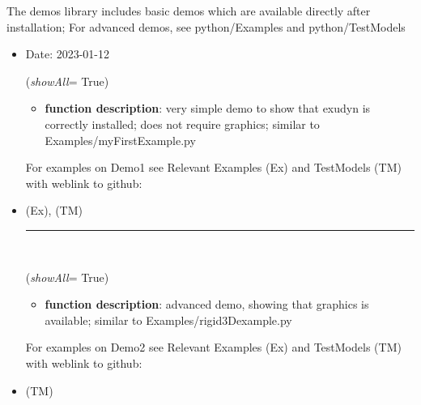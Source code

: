 \begin{itemize}[leftmargin=1.4cm]
\begin{itemize}[leftmargin=1.4cm]
\begin{itemize}[leftmargin=1.4cm]
\begin{itemize}[leftmargin=0.5cm]
\begin{itemize}[leftmargin=1.4cm]
%
\label{sec:module:demos}
  The demos library includes basic demos which are available directly after installation;
           For advanced demos, see python/Examples and python/TestModels
\begin{itemize}[leftmargin=1.4cm]
\setlength{\itemindent}{-1.4cm}
\item[]Date:      2023-01-12
\ei
\begin{flushleft}
\label{sec:demos:Demo1}
({\it showAll}= True)
\end{flushleft}
\setlength{\itemindent}{0.7cm}
\begin{itemize}[leftmargin=0.7cm]
\item[--]
{\bf function description}: very simple demo to show that exudyn is correctly installed; does not require graphics; similar to Examples/myFirstExample.py
\vspace{12pt}\end{itemize}
%
%
\noindent For examples on Demo1 see Relevant Examples (Ex) and TestModels (TM) with weblink to github:
\bi
 \item \footnotesize {} (Ex), 
 (TM)
\ei

%
\noindent\rule{8cm}{0.75pt}\vspace{1pt} \\ 
\begin{flushleft}
\label{sec:demos:Demo2}
({\it showAll}= True)
\end{flushleft}
\setlength{\itemindent}{0.7cm}
\begin{itemize}[leftmargin=0.7cm]
\item[--]
{\bf function description}: advanced demo, showing that graphics is available; similar to Examples/rigid3Dexample.py
\vspace{12pt}\end{itemize}
%
%
\noindent For examples on Demo2 see Relevant Examples (Ex) and TestModels (TM) with weblink to github:
\bi
 \item \footnotesize {} (TM)
\ei


\end{itemize}
\end{itemize}
\end{itemize}
\end{itemize}
\end{itemize}
\end{itemize}

